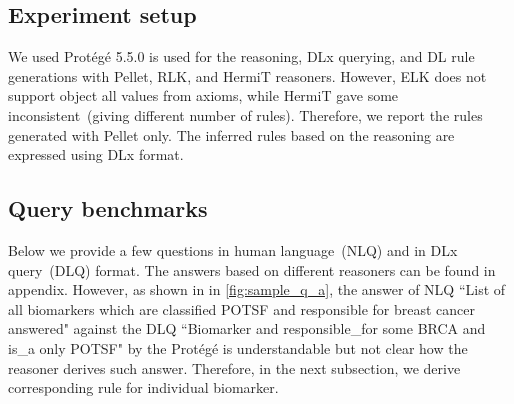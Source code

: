 \subsection{Experiment setup}
We used Prot{\'e}g{\'e} 5.5.0 is used for the reasoning, DLx querying, and DL rule generations with Pellet, RLK, and HermiT reasoners. 
However, ELK does not support object all values from axioms, while HermiT gave some inconsistent~(giving different number of rules). Therefore, we report the rules generated with Pellet only. The inferred rules based on the reasoning are expressed using DLx format. 

\subsection{Query benchmarks}
Below we provide a few questions in human language~(NLQ) and in DLx query~(DLQ) format. The answers based on different reasoners can be found in appendix. However, as shown in in \cref{fig:sample_q_a}, the answer of NLQ ``List of all biomarkers which are classified POTSF and responsible for breast cancer answered" against the DLQ ``Biomarker and responsible\_for some BRCA and is\_a only POTSF" by the Prot{\'e}g{\'e} is understandable but not clear how the reasoner derives such answer. Therefore, in the next subsection, we derive corresponding rule for individual biomarker. 

